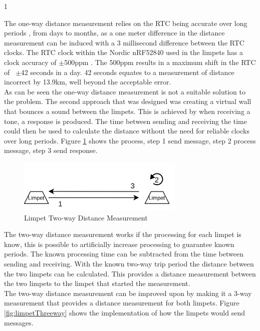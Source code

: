 1\documentclass{article}
\begin{document}
The one-way distance measurement relies on the RTC being accurate over long periods \cite{rtccomp}, from days to months, as a one meter difference in the distance measurement can be induced with a 3 millisecond difference between the RTC clocks. The RTC clock within the Nordic nRF52840 used in the limpets has a clock accuracy of $\pm$500ppm \cite{nrf52840}. The 500ppm results in a maximum shift in the RTC of ~$\pm$42 seconds in a day. 42 seconds equates to a measurement of distance incorrect by 13.9km, well beyond the acceptable error.\\

As can be seen the one-way distance measurement is not a suitable solution to the problem. The second approach that was designed was creating a virtual wall that bounces a sound between the limpets. This is achieved by when receiving a tone, a response is produced. The time between sending and receiving the time could then be used to calculate the distance without the need for reliable clocks over long periods. Figure \ref{fig:limpetTwoway} shows the process, step 1 send message, step 2 process message, step 3 send response.\\

\begin{figure}[H]
	\centering
	\noindent\includegraphics[width=0.71\textwidth]{images/limpetTwoway}
	\caption{Limpet Two-way Distance Measurement}
	\label{fig:limpetTwoway}
\end{figure}

The two-way distance measurement works if the processing for each limpet is know, this is possible to artificially increase processing to guarantee known periods. The known processing time can be subtracted from the time between sending and receiving. With the known two-way trip period the distance between the two limpets can be calculated. This provides a distance measurement between the two limpets to the limpet that started the measurement.\\

The two-way distance measurement can be improved upon by making it a 3-way measurement that provides a distance measurement for both limpets. Figure \ref{fig:limpetThreeway} shows the implementation of how the limpets would send messages.
\end{document}
